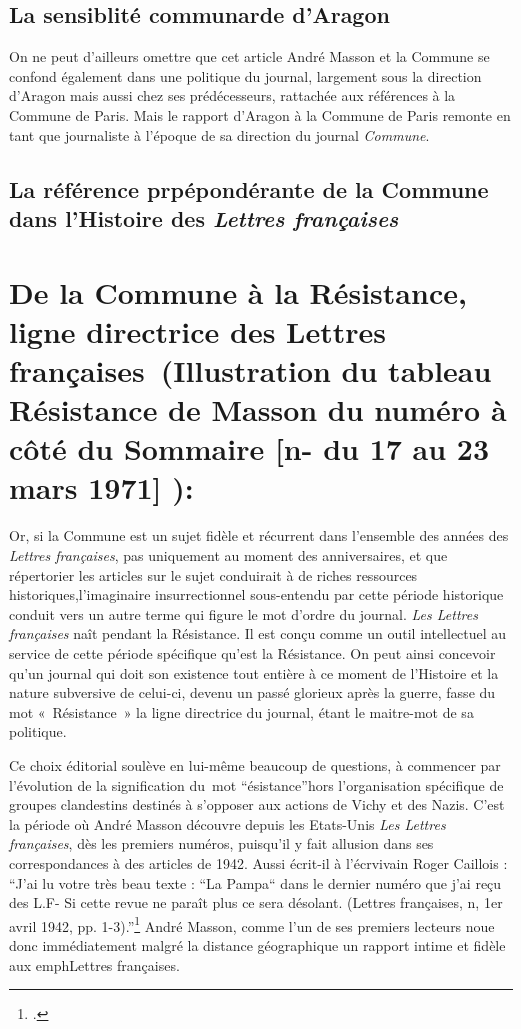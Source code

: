 \subsection{La sensiblité communarde d'Aragon}
 On ne peut d’ailleurs omettre que cet article André Masson et la Commune se confond également dans une politique du journal, largement sous la direction d’Aragon mais aussi chez ses prédécesseurs, rattachée aux références à la Commune de Paris. Mais le rapport d’Aragon à la Commune de Paris remonte en tant que journaliste à l’époque de sa direction du journal \emph{Commune}. 



\subsection{La référence prpépondérante de la Commune dans l'Histoire des \emph{Lettres françaises}}


\section{De la Commune à la Résistance, ligne directrice des Lettres françaises (Illustration du tableau Résistance de Masson du numéro à côté du Sommaire [n- du 17 au 23 mars 1971] ):}

Or, si la Commune est un sujet fidèle et récurrent dans l’ensemble des années des \emph{Lettres françaises}, pas uniquement au moment des anniversaires, et que répertorier les articles sur le sujet conduirait à de riches ressources historiques,l’imaginaire insurrectionnel sous-entendu par cette période historique conduit vers un autre terme qui figure le mot d’ordre du journal. \emph{Les Lettres françaises} naît pendant la Résistance. Il est conçu comme un outil intellectuel au service de cette période spécifique qu’est la Résistance. On peut ainsi concevoir qu’un journal qui doit son existence tout entière à ce moment de l’Histoire et la nature subversive de celui-ci, devenu un passé glorieux après la guerre, fasse du mot « Résistance » la ligne directrice du journal, étant le maitre-mot de sa politique. 


	Ce choix éditorial soulève en lui-même beaucoup de questions, à commencer par l’évolution de la signification du mot \enquote{ésistance}hors l’organisation spécifique de groupes clandestins destinés à s’opposer aux actions de Vichy et des Nazis. C’est la période où André Masson découvre depuis les Etats-Unis \emph{Les Lettres françaises}, dès les premiers numéros, puisqu’il y  fait allusion dans ses correspondances à des articles de 1942. Aussi écrit-il à l’écrvivain Roger Caillois : \enquote{J’ai lu votre très beau texte : “La Pampa“ dans le dernier numéro que j’ai reçu des L.F- Si cette revue ne paraît plus ce sera désolant. (Lettres françaises, n, 1er avril 1942, pp. 1-3).}\footcite[p482]{anneessurrealistes} André Masson, comme l’un de ses premiers lecteurs noue donc immédiatement malgré la distance géographique un rapport intime et fidèle aux emph{Lettres françaises}. 


